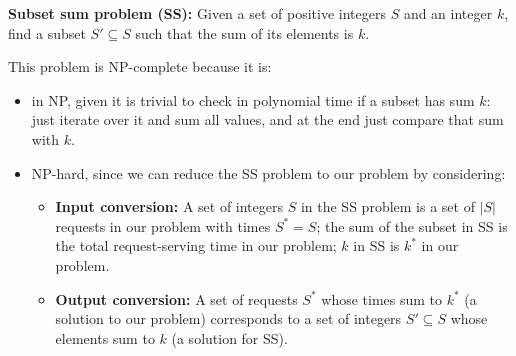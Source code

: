 {\textbf{Subset sum problem (SS): } Given a set of positive integers $S$ and an integer $k$, find a subset $S' \subseteq S$ such that the sum of its elements is $k$.

\ansseparator

This problem is NP-complete because it is:
\begin{itemize}
    \item in NP, given it is trivial to check in polynomial time if a subset has sum $k$: just iterate over it and sum all values, and at the end just compare that sum with $k$.
    \item NP-hard, since we can reduce the SS problem to our problem by considering:
    \begin{itemize}
        \item \textbf{Input conversion:} A set of integers $S$ in the SS problem is a set of $|S|$ requests in our problem with times $S^* = S$; the sum of the subset in SS is the total request-serving time in our problem; $k$ in SS is $k^*$ in our problem.
        \item \textbf{Output conversion:} A set of requests $S^*$ whose times sum to $k^*$ (a solution to our problem) corresponds to a set of integers $S' \subseteq S$ whose elements sum to $k$ (a solution for SS).
    \end{itemize}
\end{itemize}

}
